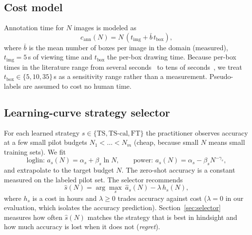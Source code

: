 \subsection{Cost model}
Annotation time for $N$ images is modeled as
\begin{equation}
c_{\text{ann}}(N)=N\,(t_{\text{img}}+\bar b\,t_{\text{box}}),
\end{equation}
where $\bar b$ is the mean number of boxes per image in the domain (measured), $t_{\text{img}}=5$\,s of viewing time and $t_{\text{box}}$ the per-box drawing time. Because per-box times in the literature range from several seconds~\cite{papadopoulos2017extreme} to tens of seconds~\cite{su2012crowdsourcing}, we treat $t_{\text{box}}\in\{5,10,35\}$\,s as a sensitivity range rather than a measurement. Pseudo-labels are assumed to cost no human time.

\subsection{Learning-curve strategy selector}
For each learned strategy $s\in\{\text{TS},\text{TS-cal},\text{FT}\}$ the practitioner observes accuracy at a few small pilot budgets $N_1<\dots<N_m$ (cheap, because small $N$ means small training sets). We fit
\begin{equation}
\text{loglin: } a_s(N)=\alpha_s+\beta_s\ln N,\qquad
\text{power: } a_s(N)=\alpha_s-\beta_s N^{-\gamma_s},
\end{equation}
and extrapolate to the target budget $N$. The zero-shot accuracy is a constant measured on the labeled pilot set. The selector recommends
\begin{equation}
\hat s(N)=\arg\max_{s}\ \hat a_s(N)-\lambda\, h_s(N),
\end{equation}
where $h_s$ is a cost in hours and $\lambda\ge0$ trades accuracy against cost ($\lambda=0$ in our evaluation, which isolates the accuracy prediction). Section~\ref{sec:selector} measures how often $\hat s(N)$ matches the strategy that is best in hindsight and how much accuracy is lost when it does not (\emph{regret}).

